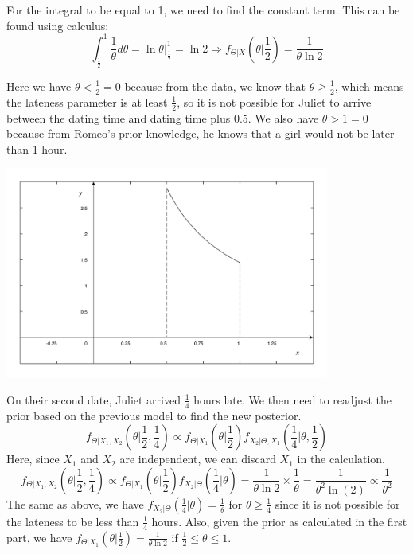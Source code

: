 \begin{eg}
  For the integral to be equal to 1, we need to find the constant term. This can be found using calculus: 
  \[
    \int_\frac{1}{2} ^1 \dfrac{1}{\theta} d \theta= \ln \theta \Big|_{\frac{1}{2}}^1 = \ln 2 \Longrightarrow f_{\Theta \vert X} (\theta \vert \dfrac{1}{2}) = \dfrac{1}{\theta \ln 2}
  \]

  \begin{minipage}{0.5\textwidth}
    Here we have \(\theta < \frac{1}{2} = 0\) because from the data, we know that \(\theta \geq \frac{1}{2}\), which means the lateness parameter is at least \(\frac{1}{2}\), so it is not possible for Juliet to arrive between the dating time and dating time plus 0.5. We also have \(\theta > 1 = 0\) because from Romeo's prior knowledge, he knows that a girl would not be later than 1 hour.
  \end{minipage}
  \begin{minipage}{0.5\textwidth}
    \centering
    \includegraphics[width=0.8\textwidth]{Figures/Romeo_model.pdf}
  \end{minipage}

  On their second date, Juliet arrived \(\frac{1}{4}\) hours late. We then need to readjust the prior based on the previous model to find the new posterior.
  \[
    f_{\Theta \vert X_1, X_2} \left(\theta \Big| \dfrac{1}{2}, \dfrac{1}{4}\right) \propto f_{\Theta \vert X_1} \left(\theta \Big| \dfrac{1}{2}\right) f_{X_2 \vert \Theta, X_1}\left(\dfrac{1}{4} \Big| \theta, \frac{1}{2}\right)
  \]
  Here, since \(X_1\) and \(X_2\) are independent, we can discard \(X_1\) in the calculation.
  \[
    f_{\Theta \vert X_1, X_2} \left(\theta \Big| \dfrac{1}{2}, \dfrac{1}{4}\right) \propto f_{\Theta \vert X_1} \left(\theta \Big| \dfrac{1}{2}\right) f_{X_2 \vert \Theta}\left(\dfrac{1}{4} \Big| \theta\right) = \dfrac{1}{\theta \ln 2} \times \dfrac{1}{\theta} = \dfrac{1}{\theta^{2} \ln{(2)}} \propto \dfrac{1}{\theta^2}
  \]
  The same as above, we have \(f_{X_2 \vert \Theta} (\frac{1}{4} \vert \theta) = \frac{1}{\theta}\) for \(\theta \geq \frac{1}{4}\) since it is not possible for the lateness to be less than \(\frac{1}{4}\) hours. Also, given the prior as calculated in the first part, we have \(f_{\Theta \vert X_1} (\theta \vert \frac{1}{2}) = \frac{1}{\theta \ln 2}\) if \(\frac{1}{2} \leq \theta \leq 1\).


\end{eg}
